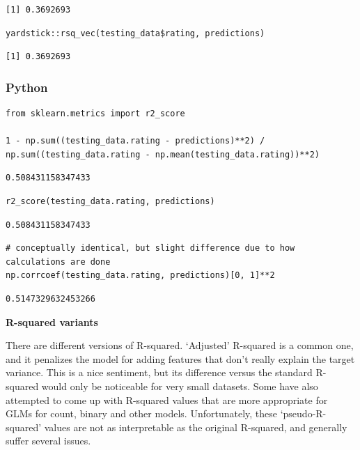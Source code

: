 \documentclass[
  letterpaper,
]{krantz}
\begin{document}
\begin{verbatim}
[1] 0.3692693
\end{verbatim}

\begin{verbatim}
yardstick::rsq_vec(testing_data$rating, predictions)
\end{verbatim}

\begin{verbatim}
[1] 0.3692693
\end{verbatim}

\subsubsection{Python}

\begin{verbatim}
from sklearn.metrics import r2_score

1 - np.sum((testing_data.rating - predictions)**2) / np.sum((testing_data.rating - np.mean(testing_data.rating))**2)
\end{verbatim}

\begin{verbatim}
0.508431158347433
\end{verbatim}

\begin{verbatim}
r2_score(testing_data.rating, predictions)
\end{verbatim}

\begin{verbatim}
0.508431158347433
\end{verbatim}

\begin{verbatim}
# conceptually identical, but slight difference due to how calculations are done
np.corrcoef(testing_data.rating, predictions)[0, 1]**2
\end{verbatim}

\begin{verbatim}
0.5147329632453266
\end{verbatim}

\begin{tcolorbox}[enhanced jigsaw, opacityback=0, leftrule=.75mm, bottomrule=.15mm, colframe=quarto-callout-tip-color-frame, rightrule=.15mm, breakable, left=2mm, colback=white, arc=.35mm, toprule=.15mm]

\vspace{-3mm}\textbf{R-squared variants}\vspace{3mm}

There are different versions of R-squared. `Adjusted' R-squared is a
common one, and it penalizes the model for adding features that don't
really explain the target variance. This is a nice sentiment, but its
difference versus the standard R-squared would only be noticeable for
very small datasets. Some have also attempted to come up with R-squared
values that are more appropriate for GLMs for count, binary and other
models. Unfortunately, these `pseudo-R-squared' values are not as
interpretable as the original R-squared, and generally suffer several
issues.

\end{tcolorbox}
\end{document}
